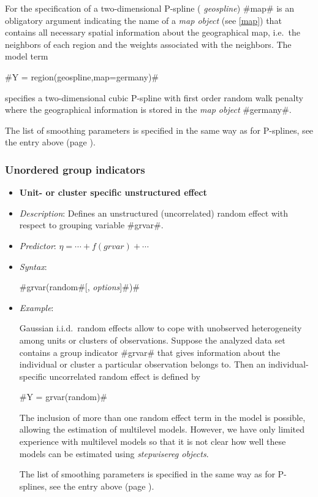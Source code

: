 \begin{itemize}
For the specification of a two-dimensional P-spline ({\em
geospline}) #map# is an obligatory argument indicating the name of
a {\em map object} (see \autoref{map}) that contains all necessary
spatial information about the geographical map, i.e.~the neighbors
of each region and the weights associated with the neighbors. The
model term

#Y = region(geospline,map=germany)#

specifies a two-dimensional cubic P-spline with first order random
walk penalty where the geographical information is stored in the
{\em map object} #germany#.

The list of smoothing parameters is specified in the same way as for P-splines, see the entry above (page \pageref{psplines_stepwise}).
\end{itemize}

\subsubsection*{Unordered group indicators}

\begin{itemize}
\item[]{\bf\sffamily Unit- or cluster specific unstructured
effect}

\item[] {\em Description}: Defines an unstructured (uncorrelated)
random effect with respect to grouping variable #grvar#. \item[]
{\em Predictor}: $\eta = \cdots + f(grvar) + \cdots$ \item[] {\em
Syntax}:

#grvar(random#[, {\em options}]#)#
\item[] {\em Example}:

Gaussian i.i.d.~random effects allow to cope with unobserved
heterogeneity among units or clusters of observations. Suppose the
analyzed data set contains a group indicator #grvar# that gives
information about the individual or cluster a particular
observation belongs to. Then an individual-specific uncorrelated
random effect is defined by

#Y = grvar(random)#

The inclusion of more than one random effect term in the model is
possible, allowing the estimation of multilevel models. However,
we have only limited experience with multilevel models so that it
is not clear how well these models can be estimated using {\em
stepwisereg objects}.

The list of smoothing parameters is specified in the same way as for P-splines, see the entry above (page \pageref{psplines_stepwise}).
\end{itemize}

